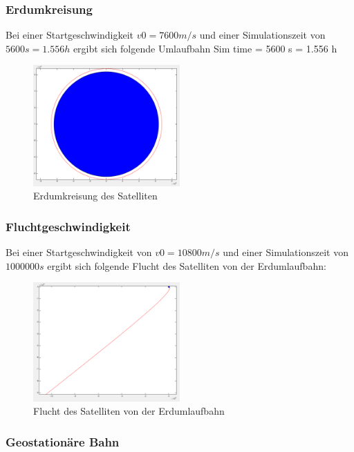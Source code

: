 \documentclass[10pt,a4paper]{article}
\begin{document}
\subsubsection{Erdumkreisung}
Bei einer Startgeschwindigkeit $v0 = 7600 m/s$ und einer Simulationszeit von $5600s = 1.556 h$ ergibt sich folgende Umlaufbahn
Sim time = 5600 s = 1.556 h
	\begin{figure}[H]
		\centering
		\includegraphics[width=0.5\textwidth]{../aufgabe1/screens/1a.png}
		\caption{Erdumkreisung des Satelliten}
	\end{figure}

\subsubsection{Fluchtgeschwindigkeit}
Bei einer Startgeschwindigkeit von $v0 = 10800 m/s$ und einer Simulationszeit von $1000000s$ ergibt sich folgende Flucht des Satelliten von der Erdumlaufbahn:

	\begin{figure}[H]
		\centering
		\includegraphics[width=0.5\textwidth]{../aufgabe1/screens/1b.png}
		\caption{Flucht des Satelliten von der Erdumlaufbahn}
	\end{figure}

\subsubsection{Geostationäre Bahn} 
\end{document}
